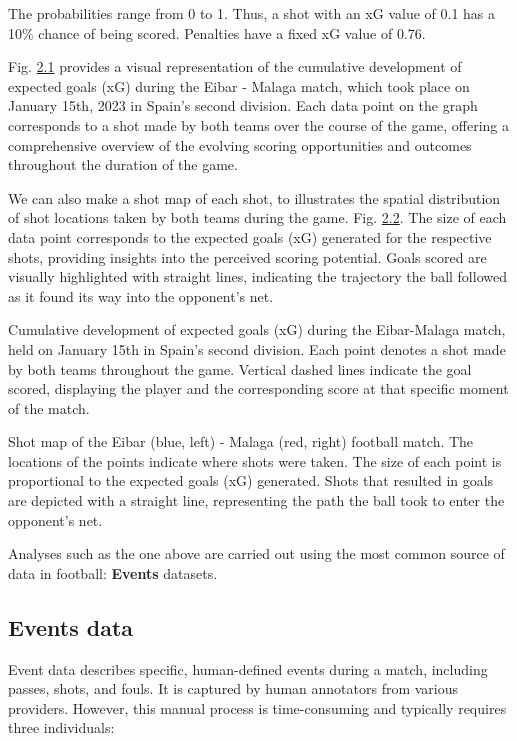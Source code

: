 \documentclass[twoside,nohyper]{tufte-book}
\begin{document}
The probabilities range from 0 to 1. Thus, a shot with an xG value of
0.1 has a 10\% chance of being scored. Penalties have a fixed xG value of
0.76.

Fig. \protect\hyperlink{f2.1}{2.1} provides a
visual representation of the cumulative development of expected goals
(xG) during the Eibar - Malaga match, which took place on January 15th,
2023 in Spain's second division. Each data point on the graph
corresponds to a shot made by both teams over the course of the game,
offering a comprehensive overview of the evolving scoring opportunities
and outcomes throughout the duration of the game.

We can also make a shot map of each shot, to illustrates the spatial
distribution of shot locations taken by both teams during the game. Fig.
\protect\hyperlink{f2.2}{2.2}. The size of each
data point corresponds to the expected goals (xG) generated for the
respective shots, providing insights into the perceived scoring
potential. Goals scored are visually highlighted with straight lines,
indicating the trajectory the ball followed as it found its way into the
opponent's net.

Cumulative development of expected goals (xG) during the
Eibar-Malaga match, held on January 15th in Spain's second division.
Each point denotes a shot made by both teams throughout the game.
Vertical dashed lines indicate the goal scored, displaying the player
and the corresponding score at that specific moment of the match.

Shot map of the Eibar (blue, left) - Malaga (red, right)
football match. The locations of the points indicate where shots were
taken. The size of each point is proportional to the expected goals (xG)
generated. Shots that resulted in goals are depicted with a straight
line, representing the path the ball took to enter the opponent's
net.

Analyses such as the one above are carried out using the most common
source of data in football: \textbf{Events} datasets.

\hypertarget{events-data}{%
\subsection{Events data}\label{events-data}}

Event data describes specific, human-defined events during a match,
including passes, shots, and fouls. It is captured by human annotators
from various providers. However, this manual process is time-consuming
and typically requires three individuals:
\end{document}
